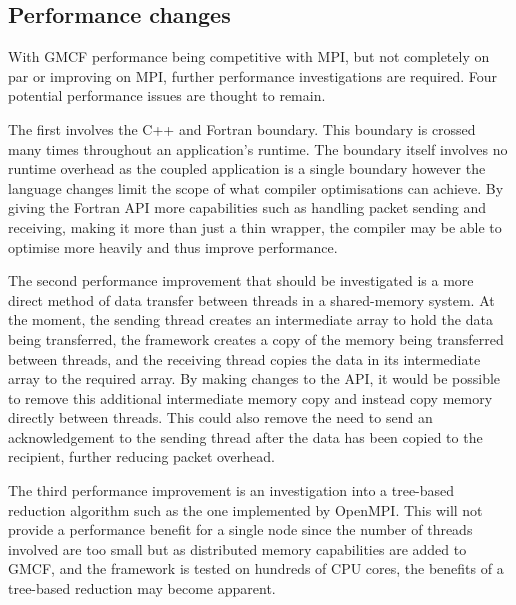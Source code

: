 \subsection{Performance changes}

With GMCF performance being competitive with MPI, but not completely on par or
improving on MPI, further performance investigations are required. Four
potential performance issues are thought to remain.

The first involves the C++ and Fortran boundary. This boundary is crossed many
times throughout an application's runtime. The boundary itself involves no
runtime overhead as the coupled application is a single boundary however the
language changes limit the scope of what compiler optimisations can achieve. By
giving the Fortran API more capabilities such as handling packet sending and
receiving, making it more than just a thin wrapper, the compiler may be able to
optimise more heavily and thus improve performance.

The second performance improvement that should be investigated is a more direct
method of data transfer between threads in a shared-memory system. At the
moment, the sending thread creates an intermediate array to hold the data being
transferred, the framework creates a copy of the memory being transferred
between threads, and the receiving thread copies the data in its intermediate
array to the required array. By making changes to the API, it would be possible
to remove this additional intermediate memory copy and instead copy memory
directly between threads. This could also remove the need to send an
acknowledgement to the sending thread after the data has been copied to the
recipient, further reducing packet overhead.

The third performance improvement is an investigation into a tree-based
reduction algorithm such as the one implemented by OpenMPI. This will not
provide a performance benefit for a single node since the number of threads
involved are too small but as distributed memory capabilities are added to GMCF,
and the framework is tested on hundreds of CPU cores, the benefits of a
tree-based reduction may become apparent.

